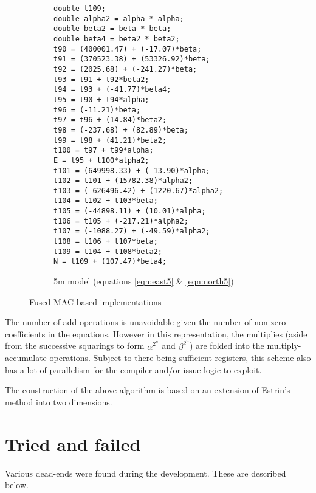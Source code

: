 \documentclass[10pt,a4paper]{article}
\begin{document}
\begin{figure}[htb]
\begin{subfigure}[b]{0.45\textwidth}
\begin{verbatim}
double t109;
double alpha2 = alpha * alpha;
double beta2 = beta * beta;
double beta4 = beta2 * beta2;
t90 = (400001.47) + (-17.07)*beta;
t91 = (370523.38) + (53326.92)*beta;
t92 = (2025.68) + (-241.27)*beta;
t93 = t91 + t92*beta2;
t94 = t93 + (-41.77)*beta4;
t95 = t90 + t94*alpha;
t96 = (-11.21)*beta;
t97 = t96 + (14.84)*beta2;
t98 = (-237.68) + (82.89)*beta;
t99 = t98 + (41.21)*beta2;
t100 = t97 + t99*alpha;
E = t95 + t100*alpha2;
t101 = (649998.33) + (-13.90)*alpha;
t102 = t101 + (15782.38)*alpha2;
t103 = (-626496.42) + (1220.67)*alpha2;
t104 = t102 + t103*beta;
t105 = (-44898.11) + (10.01)*alpha;
t106 = t105 + (-217.21)*alpha2;
t107 = (-1088.27) + (-49.59)*alpha2;
t108 = t106 + t107*beta;
t109 = t104 + t108*beta2;
N = t109 + (107.47)*beta4;
    \end{verbatim}
\caption{5m model (equations \eqref{eqn:east5} \& \eqref{eqn:north5})}
\end{subfigure}

  \caption{Fused-MAC based implementations}
  \label{fig:fused-mac}

  \hrulefill

\end{figure}

The number of add operations is unavoidable given the number of non-zero
coefficients in the equations.  However in this representation, the multiplies
(aside from the successive squarings to form $\alpha^{2^n}$ and $\beta^{2^n}$) are
folded into the multiply-accumulate operations.  Subject to there being
sufficient registers, this scheme also has a lot of parallelism for the
compiler and/or issue logic to exploit.

The construction of the above algorithm is based on an extension of Estrin's
method \cite{estrin} into two dimensions.

\section {Tried and failed}

Various dead-ends were found during the development.  These are described below.
\end{document}
